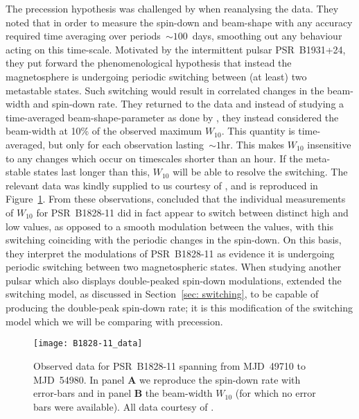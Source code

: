 \documentclass[../full_thesis/full_thesis.tex]{subfiles}
\begin{document}
The precession hypothesis was challenged by \citet{Lyne2010} when reanalysing
the data.   They noted that in order to measure the spin-down and beam-shape
with any accuracy required time averaging over periods~$\sim100$~days,
smoothing out any behaviour acting on this time-scale. Motivated by the
intermittent pulsar PSR~B1931+24, they put forward the phenomenological hypothesis
that instead the magnetosphere is undergoing periodic switching between (at
least) two metastable states. Such switching would result in correlated changes
in the beam-width and spin-down rate. They returned to the data and instead of
studying a time-averaged beam-shape-parameter as done by \citet{Stairs2000},
they instead considered the beam-width at 10\% of the observed maximum
$W_{10}$. This quantity is time-averaged, but only for each observation
lasting~$\sim1$hr. This makes $W_{10}$ insensitive to any changes which occur on
timescales shorter than an hour. If the meta-stable states last longer than
this, $W_{10}$ will be able to resolve the switching. The  relevant data was
kindly supplied to us courtesy of \citet{Lyne2010}, and is reproduced in
Figure~\ref{fig: B1828-11 data}. From these observations,
\citet{Lyne2010} concluded that the individual measurements of $W_{10}$ for
PSR~B1828-11 did in fact appear to switch between distinct high and low values, as
opposed to a smooth modulation between the values, with this switching
coinciding with the periodic changes in the spin-down. On this basis, they
interpret the modulations of PSR~B1828-11 as evidence it is undergoing periodic
switching between two magnetospheric states. When studying another pulsar which
also displays double-peaked spin-down modulations, \citet{Perera2015} extended
the switching model, as discussed in Section~\ref{sec: switching}, to be capable
of producing the double-peak spin-down rate; it is this modification of the
switching model which we will be comparing with precession.

\begin{figure}
\centering
\texttt{[image: B1828-11\_data]}
\caption{Observed data for PSR~B1828-11 spanning from MJD~49710 to MJD~54980.
         In panel $\textbf{A}$ we reproduce the spin-down rate with error-bars
         and in panel $\textbf{B}$ the beam-width $W_{10}$
          (for which no error bars were available). All data
         courtesy of \citet{Lyne2010}.}
\label{fig: B1828-11 data}
\end{figure}
\end{document}
